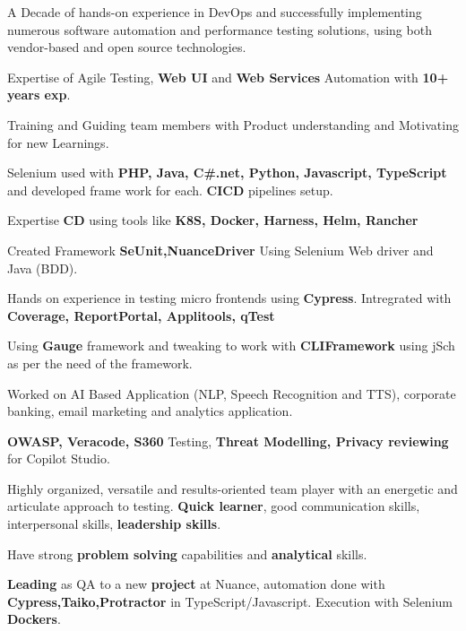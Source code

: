 

\begin{cventries}
\begin{cvitemize}
 \item {A Decade of hands-on experience in DevOps and successfully implementing numerous software automation and performance testing solutions, using both vendor-based and open source technologies.}
 \item {Expertise of Agile Testing, \textbf{Web UI} and \textbf{Web Services} Automation with \textbf{10+ years exp}.}
 \item {Training and Guiding team members with Product understanding and Motivating for new Learnings.}
 \item {Selenium used with \textbf{PHP, Java, C\#.net, Python, Javascript, TypeScript} and developed frame work for each. \textbf{CICD} pipelines setup.}
 \item {Expertise \textbf{CD} using tools like \textbf{K8S, Docker, Harness, Helm, Rancher}}

 \item {Created Framework \textbf{SeUnit,NuanceDriver} Using Selenium Web driver and Java (BDD).}

 \item {Hands on experience in testing micro frontends using \textbf{Cypress}. Intregrated with \textbf{Coverage, ReportPortal, Applitools, qTest}} 

 \item {Using \textbf{Gauge} framework and tweaking to work with \textbf{CLIFramework} using jSch as per the need of the framework.}

 \item {Worked on AI Based Application (NLP, Speech Recognition and TTS), corporate banking, email marketing and analytics application.}

 \item {\textbf{OWASP, Veracode, S360} Testing, \textbf{Threat Modelling, Privacy reviewing} for Copilot Studio.}

 \item {Highly organized, versatile and results-oriented team player with an energetic and articulate approach to testing. \textbf{Quick learner}, good communication skills, interpersonal skills, \textbf{leadership skills}.}

 \item {Have strong \textbf{problem solving} capabilities and \textbf{analytical} skills.} 
 \item {\textbf{Leading} as QA to a new \textbf{project} at Nuance, automation done with \textbf{Cypress,Taiko,Protractor} in TypeScript/Javascript. Execution with Selenium \textbf{Dockers}.}
\end{cvitemize}
\end{cventries}
